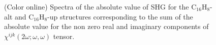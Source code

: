 \documentclass[pss]{wiley2sp} %
\begin{document}
\begin{figure}[t]
\hfill
{}
\caption{(Color online) Spectra of the absolute value of SHG for the C$_{16}$H$_{8}$-alt 
    and C$_{16}$H$_{8}$-up structures corresponding to the sum of the absolute 
    value for the non zero real and imaginary components of $\chi^{ijk}(2\omega;\omega,
    \omega) $ tensor.\label{fig:shg-abs-both}}
\end{figure}
\end{document}
